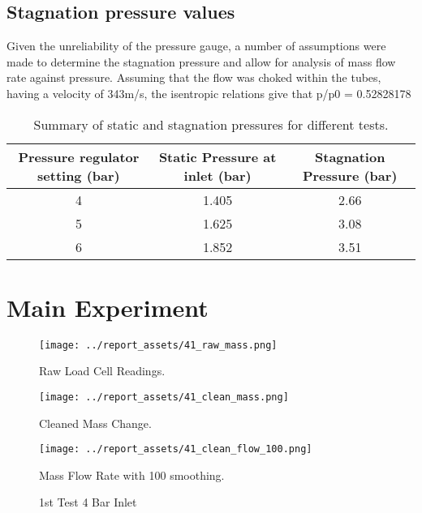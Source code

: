 \subsection{Stagnation pressure values}
Given the unreliability of the pressure gauge, a number of assumptions were made to determine the stagnation pressure and allow for analysis of mass flow rate against pressure. Assuming that the flow was choked within the tubes, having a velocity of 343m/s, the isentropic relations give that p/p0 =  0.52828178
\begin{table}[htbp]
    \centering
    \begin{tabular}{|c|c|c|}
        \hline
        Pressure regulator setting (bar) & Static Pressure at inlet (bar) &  Stagnation Pressure (bar) \\
        \hline
        4 & 1.405 & 2.66 \\
        5 & 1.625 & 3.08 \\
        6 & 1.852 & 3.51 \\
        \hline
    \end{tabular}    
    \caption{Summary of static and stagnation pressures for different tests.}
    \label{tab:static-stag-pressures}
\end{table}    


\newpage
\section{Main Experiment}
\begin{figure}[htbp]
    \centering

    \begin{minipage}{0.3\textwidth}
        \centering
        \texttt{[image: ../report\_assets/41\_raw\_mass.png]}
        \caption*{Raw Load Cell Readings.}
    \end{minipage}
    \hfill
    \begin{minipage}{0.3\textwidth}
        \centering
        \texttt{[image: ../report\_assets/41\_clean\_mass.png]}
        \caption*{Cleaned Mass Change.}
    \end{minipage}
    \hfill
    \begin{minipage}{0.3\textwidth}
        \centering
        \texttt{[image: ../report\_assets/41\_clean\_flow\_100.png]}
        \caption*{Mass Flow Rate with 100 smoothing.}
    \end{minipage}
    \caption{1st Test 4 Bar Inlet}

\end{figure}\label{fig:41}


